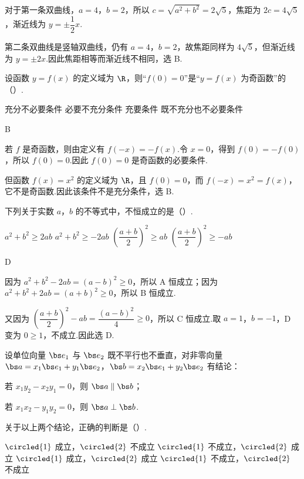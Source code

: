 \begin{solution}
对于第一条双曲线，\(a=4\)，\(b=2\)，所以 \(c=\sqrt{a^2+b^2}=2\sqrt5\)，焦距为 \(2c=4\sqrt5\)，渐近线为 \(y=\pm\dfrac12x\).

第二条双曲线是竖轴双曲线，仍有 \(a=4\)，\(b=2\)，故焦距同样为 \(4\sqrt5\)，但渐近线为 \(y=\pm2x\).因此焦距相等而渐近线不相同，选 B.
\end{solution}

\begin{problem}
设函数 \(y=f(x)\) 的定义域为 \(\R\)，则“\(f(0)=0\)”是“\(y=f(x)\) 为奇函数”的（\quad）.

\choices
    {充分不必要条件}
    {必要不充分条件}
    {充要条件}
    {既不充分也不必要条件}
\end{problem}

\begin{answer}
B
\end{answer}

\begin{solution}
若 \(f\) 是奇函数，则由定义有 \(f(-x)=-f(x)\).令 \(x=0\)，得到 \(f(0)=-f(0)\)，所以 \(f(0)=0\).因此 \(f(0)=0\) 是奇函数的必要条件.

但函数 \(f(x)=x^2\) 的定义域为 \(\R\)，且 \(f(0)=0\)，而 \(f(-x)=x^2=f(x)\)，它不是奇函数.因此该条件不是充分条件，选 B.
\end{solution}

\begin{problem}
下列关于实数 \(a\)，\(b\) 的不等式中，不恒成立的是（\quad）.

\choices
    {\(a^2+b^2\ge2ab\)}
    {\(a^2+b^2\ge-2ab\)}
    {\(\left(\dfrac{a+b}{2}\right)^2\ge ab\)}
    {\(\left(\dfrac{a+b}{2}\right)^2\ge-ab\)}
\end{problem}

\begin{answer}
D
\end{answer}

\begin{solution}
因为 \(a^2+b^2-2ab=(a-b)^2\geq0\)，所以 A 恒成立；因为 \(a^2+b^2+2ab=(a+b)^2\geq0\)，所以 B 恒成立.

又因为 \(\left(\dfrac{a+b}{2}\right)^2-ab=\dfrac{(a-b)^2}{4}\geq0\)，所以 C 恒成立.取 \(a=1\)，\(b=-1\)，D 变为 \(0\geq1\)，不成立.因此选 D.
\end{solution}

\begin{problem}
设单位向量 \(\bs e_1\) 与 \(\bs e_2\) 既不平行也不垂直，对非零向量 \(\bs a=x_1\bs e_1+y_1\bs e_2\)，\(\bs b=x_2\bs e_1+y_2\bs e_2\) 有结论：

\begin{circlelist}
\item 若 \(x_1y_2-x_2y_1=0\)，则 \(\bs a\parallel\bs b\)；
\item 若 \(x_1x_2-y_1y_2=0\)，则 \(\bs a\perp\bs b\).
\end{circlelist}

关于以上两个结论，正确的判断是（\quad）.

\choices
    {\(\circled{1}\) 成立，\(\circled{2}\) 不成立}
    {\(\circled{1}\) 不成立，\(\circled{2}\) 成立}
    {\(\circled{1}\) 成立，\(\circled{2}\) 成立}
    {\(\circled{1}\) 不成立，\(\circled{2}\) 不成立}
\end{problem}

